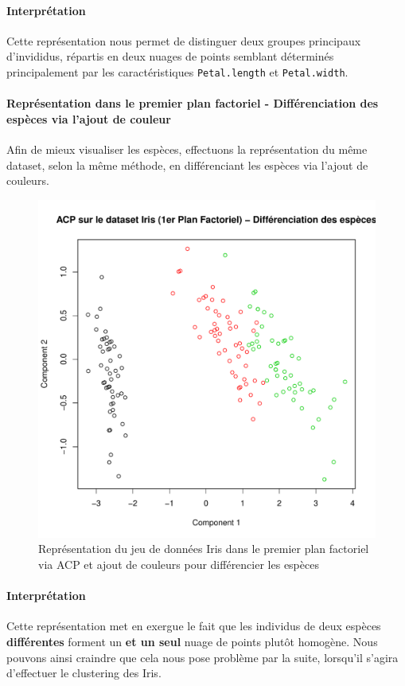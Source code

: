 \documentclass{report}
\begin{document}
\paragraph{Interprétation}
Cette représentation nous permet de distinguer deux groupes principaux d'invididus, répartis en deux nuages de points semblant déterminés principalement par les caractéristiques \verb+Petal.length+ et \verb+Petal.width+.
\newpage
\paragraph{Représentation dans le premier plan factoriel - Différenciation des espèces via l'ajout de couleur}
Afin de mieux visualiser les espèces, effectuons la représentation du même dataset, selon la même méthode, en différenciant les espèces via l'ajout de couleurs.
\begin{figure}[ht!]
\begin{center}
    \includegraphics[width=\textwidth]{../plots/E1Q1_2_ACPiris.pdf}
    \caption{Représentation du jeu de données Iris dans le premier plan factoriel via ACP et ajout de couleurs pour différencier les espèces}
\end{center}
\end{figure}
\paragraph{Interprétation}
Cette représentation met en exergue le fait que les individus de deux espèces \textbf{différentes} forment un \textbf{et un seul} nuage de points plutôt homogène. Nous pouvons ainsi craindre que cela nous pose problème par la suite, lorsqu'il s'agira d'effectuer le clustering des Iris.
\newpage
\end{document}
